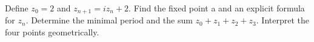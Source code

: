 \documentclass[11pt]{article}
\begin{document}
Define \(z_{0}=2\) and \(z_{n+1}=i z_{n}+2\). Find the fixed point a and an explicit formula for \(z_{n}\). Determine the minimal period and the sum \(z_{0}+z_{1}+z_{2}+z_{3}\). Interpret the four points geometrically.\par
\vspace{5pt}
\end{document}
